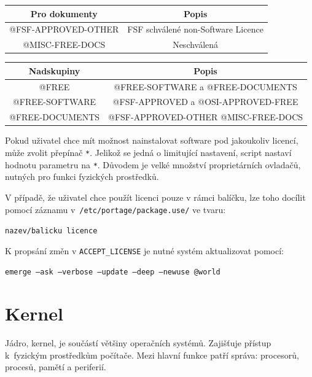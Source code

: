 \documentclass[12pt,a4paper,twoside,]{article}
\begin{document}
{{{{{{{\begin{table}[h]
\begin{tabular}{|c|c|c|}
	\end{tabular}
\end{table}
\begin{table}[h]
	\centering
	\begin{tabular}{|c|c|}
		\hline
		Pro dokumenty & Popis \\
		\hline
		@FSF-APPROVED-OTHER & FSF schválené non-Software Licence \\
		\hline
		@MISC-FREE-DOCS & Neschválená \\
		\hline
	\end{tabular}
\end{table}
\begin{table}[h]
	\centering
	\begin{tabular}{|c|c|}
	\hline
	Nadskupiny & Popis \\
	\hline
	@FREE & @FREE-SOFTWARE a @FREE-DOCUMENTS \\
	\hline
	@FREE-SOFTWARE & @FSF-APPROVED a @OSI-APPROVED-FREE\\
	\hline
	@FREE-DOCUMENTS & @FSF-APPROVED-OTHER @MISC-FREE-DOCS\\
	\hline
	\end{tabular}
\end{table}
Pokud uživatel chce mít možnost nainstalovat software pod jakoukoliv licencí, může zvolit přepínač \texttt{*}.
Jelikož se jedná o limitující nastavení, script nastaví hodnotu parametru na \texttt{*}. Důvodem je velké množství proprietárních ovladačů, nutných pro funkci fyzických prostředků.


V případě, že uživatel chce použít licenci pouze v rámci balíčku, lze toho docílit pomocí záznamu v~\texttt{/etc/portage/package.use/} ve tvaru:

\texttt{nazev/balicku licence}

\hspace{-1.5em}K propsání změn v \texttt{ACCEPT\_LICENSE} je nutné systém aktualizovat pomocí:

\texttt{emerge --ask --verbose --update --deep --newuse @world}


\newpage

\section{\textsf{Kernel}}\hypertarget{Kernel}{}
Jádro, kernel, je součástí většiny operačních systémů. Zajišťuje přístup k~fyzickým prostředkům počítače. Mezi hlavní funkce patří správa: procesorů, procesů, pamětí a periferií. 

}}}}}}}
\end{document}
